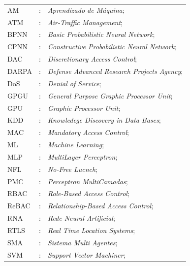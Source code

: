 \cleardoublepage
{}
\begin{tabular}{lcl}	
AM & : & \textit{Aprendizado de Máquina};\\
ATM & : & \textit{Air-Traffic Management};\\
BPNN & : & \textit{Basic Probabilistic Neural Network};\\
CPNN & : & \textit{Constructive Probabilistic Neural Network};\\
DAC & : & \textit{Discretionary Access Control};\\
DARPA & : & \textit{Defense Advanced Research Projects Agency};\\
DoS & : & \textit{Denial of Service};\\
GPGU & : & \textit{General Purpose Graphic Processor Unit};\\
GPU & : & \textit{Graphic Processor Unit};\\
KDD & : & \textit{Knowledege Discovery in Data Bases};\\
MAC & : & \textit{Mandatory Access Control};\\
ML & : & \textit{Machine Learning};\\
MLP & : & \textit{MultiLayer Perceptron};\\
NFL & : & \textit{No-Free Lucnch};\\
PMC & : & \textit{Perceptron MultiCamadas};\\
RBAC & : & \textit{Role-Based Access Control};\\
ReBAC & : & \textit{Relationship-Based Access Control};\\
RNA & : & \textit{Rede Neural Artificial};\\
RTLS & : & \textit{Real Time Location Systems};\\
SMA & : & \textit{Sistema Multi Agentes};\\
SVM & : & \textit{Support Vector Machiner};\\
\end{tabular}
\pagestyle{ruledheader}
\tableofcontents


